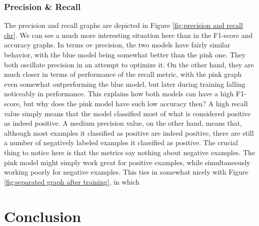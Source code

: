 \documentclass[times, utf8, diplomski, english]{fer_eng}
\begin{document}
\subsection{Precision \& Recall}
\label{subsec:precision and recall chr}

The precision and recall graphs are depicted in Figure \ref{fig:precision and recall chr}. We can see a much more interesting situation here than in the F1-score and accuracy graphs. In terms ov precision, the two models have fairly similar behavior, with the blue model being somewhat better than the pink one. They both oscillate precision in an attempt to optimize it. On the other hand, they are much closer in terms of performance of the recall metric, with the pink graph even somewhat outperforming the blue model, but later during training falling noticeably in performance. This explains how both models can have a high F1-score, but why does the pink model have such low accuracy then? A high recall value simply means that the model classified most of what is considered positive as indeed positive. A medium precision value, on the other hand, means that, although most examples it classified as positive are indeed positive, there are still a number of negatively labeled examples it classified as positive. The crucial thing to notice here is that the metrics say nothing about negative examples. The pink model might simply work great for positive examples, while simultaneously working poorly for negative examples. This ties in somewhat nicely with Figure \ref{fig:separated graph after training}, in which	

\chapter{Conclusion}
\end{document}
